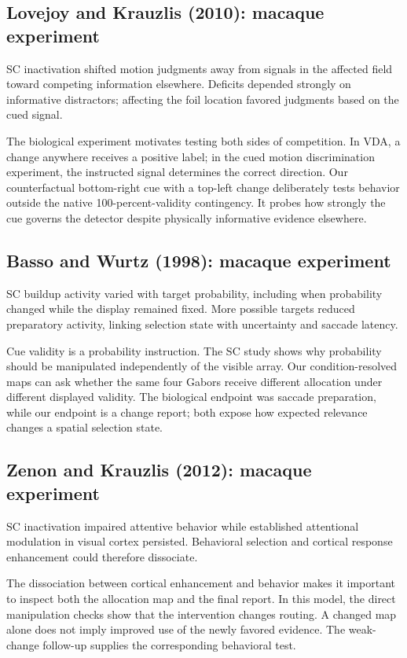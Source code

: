 \documentclass[11pt]{article}
\begin{document}
\subsection{Lovejoy and Krauzlis (2010): macaque experiment}
SC inactivation shifted motion judgments away from signals in the affected field toward competing information elsewhere. Deficits depended strongly on informative distractors; affecting the foil location favored judgments based on the cued signal. \cite{bio_lovejoy}

The biological experiment motivates testing both sides of competition. In VDA, a change anywhere receives a positive label; in the cued motion discrimination experiment, the instructed signal determines the correct direction. Our counterfactual bottom-right cue with a top-left change deliberately tests behavior outside the native 100-percent-validity contingency. It probes how strongly the cue governs the detector despite physically informative evidence elsewhere.

\subsection{Basso and Wurtz (1998): macaque experiment}
SC buildup activity varied with target probability, including when probability changed while the display remained fixed. More possible targets reduced preparatory activity, linking selection state with uncertainty and saccade latency. \cite{bio_basso}

Cue validity is a probability instruction. The SC study shows why probability should be manipulated independently of the visible array. Our condition-resolved maps can ask whether the same four Gabors receive different allocation under different displayed validity. The biological endpoint was saccade preparation, while our endpoint is a change report; both expose how expected relevance changes a spatial selection state.

\subsection{Zenon and Krauzlis (2012): macaque experiment}
SC inactivation impaired attentive behavior while established attentional modulation in visual cortex persisted. Behavioral selection and cortical response enhancement could therefore dissociate. \cite{bio_zenon}

The dissociation between cortical enhancement and behavior makes it important to inspect both the allocation map and the final report. In this model, the direct manipulation checks show that the intervention changes routing. A changed map alone does not imply improved use of the newly favored evidence. The weak-change follow-up supplies the corresponding behavioral test.
\end{document}
